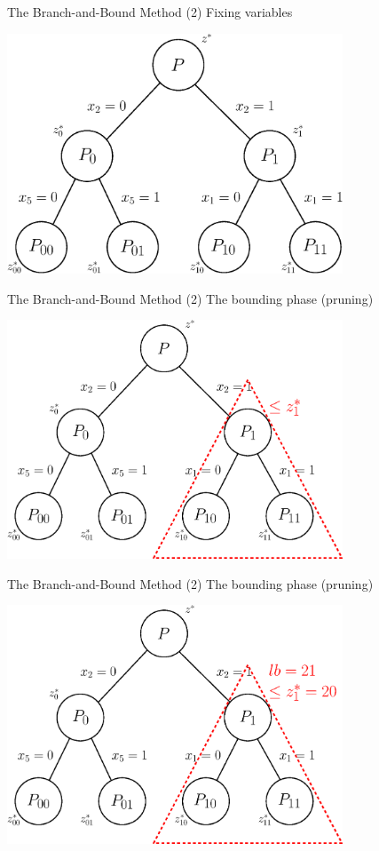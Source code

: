 \documentclass[10pt]{beamer}
\begin{document}
\begin{frame}[t]{The Branch-and-Bound Method (2)}
    Fixing variables
    \begin{center}
        \includegraphics[width=10cm]{b_and_b003.eps} 
    \end{center}
\end{frame}

\begin{frame}[t]{The Branch-and-Bound Method (2)}
    The bounding phase (pruning)
    \begin{center}
        \includegraphics[width=10cm]{b_and_b004.eps} 
    \end{center}
\end{frame}

\begin{frame}[t]{The Branch-and-Bound Method (2)}
    The bounding phase (pruning)
    \begin{center}
        \includegraphics[width=10cm]{b_and_b005.eps} 
    \end{center}
\end{frame}
\end{document}
